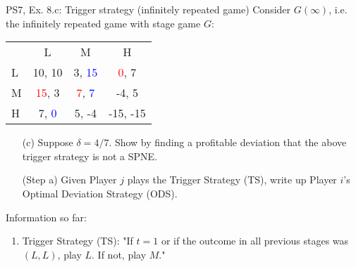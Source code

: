 \begin{frame}{PS7, Ex. 8.c: Trigger strategy (infinitely repeated game)}
    Consider $G(\infty)$, i.e. the infinitely repeated game with stage game $G$: \vspace{-6pt}
    \begin{table}
      \begin{tabular}{l|c|c|c|}
        \multicolumn{1}{c}{} & \multicolumn{1}{c}{L} & \multicolumn{1}{c}{M} & \multicolumn{1}{c}{H} \\\cline{2-4}
        L & 10, 10 & 3, \textcolor{blue}{15} & \textcolor{red}{0}, 7 \\\cline{2-4}
        M & \textcolor{red}{15}, 3 & \textcolor{red}{7}, \textcolor{blue}{7} & -4, 5 \\\cline{2-4}
        H & 7, \textcolor{blue}{0} & 5, -4 & -15, -15 \\\cline{2-4}
      \end{tabular}
    \end{table}
    \begin{itemize}
      \vspace{-4pt} \item[(c)] Suppose $\delta = 4/7$. Show by finding a profitable deviation that the above trigger strategy is not a SPNE. \vspace{-6pt}
    \end{itemize}
    \begin{multicols}{2}
      \begin{itemize}
        \item[(Step a)] Given Player $j$ plays the Trigger Strategy (TS), write up Player $i$'s Optimal Deviation Strategy (ODS).
      \end{itemize}
      \vfill\null\columnbreak
      Information so far:
      \begin{enumerate}
        \item Trigger Strategy (TS): "If $t=1$ or if the outcome in all previous stages was $(L,L)$, play $L$. If not, play $M$."
      \end{enumerate}
      \vfill\null
    \end{multicols}
\end{frame}
